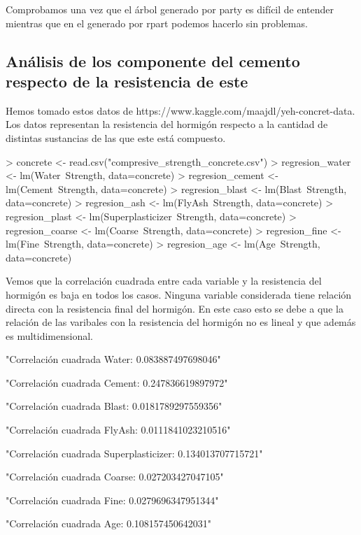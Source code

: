 \documentclass [a4paper] {article}
\begin{document}
Comprobamos una vez que el árbol generado por party es difícil de entender mientras que en el generado por rpart podemos hacerlo sin problemas.

\subsection{Análisis de los componente del cemento respecto de la resistencia de este}
Hemos tomado estos datos de https://www.kaggle.com/maajdl/yeh-concret-data.
Los datos representan la resistencia del hormigón respecto a la cantidad de distintas sustancias de las que este está compuesto.
\begin{Schunk}
\begin{Sinput}
> concrete <- read.csv("compresive_strength_concrete.csv")
> regresion_water <- lm(Water~Strength, data=concrete)
> regresion_cement <- lm(Cement~Strength, data=concrete)
> regresion_blast <- lm(Blast~Strength, data=concrete)
> regresion_ash <- lm(FlyAsh~Strength, data=concrete)
> regresion_plast <- lm(Superplasticizer~Strength, data=concrete)
> regresion_coarse <- lm(Coarse~Strength, data=concrete)
> regresion_fine <- lm(Fine~Strength, data=concrete)
> regresion_age <- lm(Age~Strength, data=concrete)
\end{Sinput}
\end{Schunk}
Vemos que la correlación cuadrada entre cada variable y la resistencia del hormigón es baja en todos los casos.
Ninguna variable considerada tiene relación directa con la resistencia final del hormigón.
En este caso esto se debe a que la relación de las varibales con la resistencia del hormigón no es lineal y que además es multidimensional.
\begin{Schunk}
\begin{Soutput}
[1] "Correlación cuadrada Water: 0.083887497698046"
\end{Soutput}
\begin{Soutput}
[1] "Correlación cuadrada Cement: 0.247836619897972"
\end{Soutput}
\begin{Soutput}
[1] "Correlación cuadrada Blast: 0.0181789297559356"
\end{Soutput}
\begin{Soutput}
[1] "Correlación cuadrada FlyAsh: 0.0111841023210516"
\end{Soutput}
\begin{Soutput}
[1] "Correlación cuadrada Superplasticizer: 0.134013707715721"
\end{Soutput}
\begin{Soutput}
[1] "Correlación cuadrada Coarse: 0.027203427047105"
\end{Soutput}
\begin{Soutput}
[1] "Correlación cuadrada Fine: 0.0279696347951344"
\end{Soutput}
\begin{Soutput}
[1] "Correlación cuadrada Age: 0.108157450642031"
\end{Soutput}
\end{Schunk}
\end{document}

